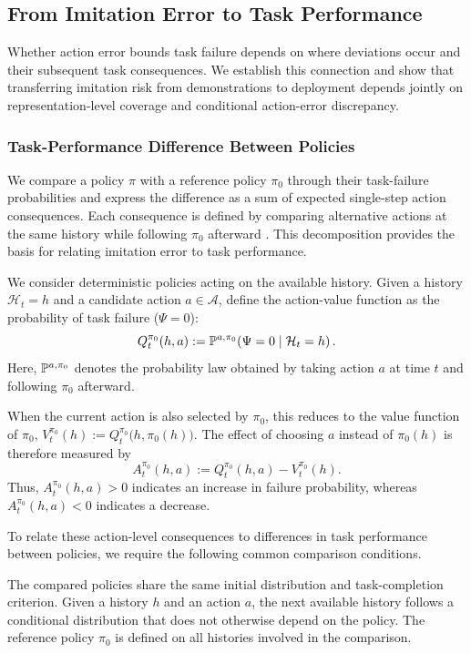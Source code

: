 \subsection{From Imitation Error to Task Performance}
\label{sec:actionanalysis}
Whether action error bounds task failure depends on where deviations occur and their subsequent task consequences.
We establish this connection and show that transferring imitation risk from demonstrations to deployment
depends jointly on representation-level coverage and conditional action-error discrepancy.

\subsubsection{Task-Performance Difference Between Policies}
\label{sec:actionconsequences}
We compare a policy $\pi$ with a reference policy $\pi_0$
through their task-failure probabilities and express the
difference as a sum of expected single-step action consequences.
Each consequence is defined by comparing alternative actions
at the same history while following $\pi_0$ afterward
\cite{ross2014aggrevate,cheng2018value}.
This decomposition provides the basis for relating imitation
error to task performance.

We consider deterministic policies acting on the available history.
Given a history $\mathcal H_t=h$ and a candidate action
$a\in\mathcal A$, define the action-value function as the
probability of task failure ($\Psi=0$):
\begin{equation}
 Q_t^{\pi_0}(h,a)
 :=\mathbb P^{a,\pi_0}\!\left(\Psi=0\mid\mathcal H_t=h\right).
 \label{eq:historyactionvalue}
\end{equation}
Here, $\mathbb P^{a,\pi_0}$ denotes the probability law obtained by
taking action $a$ at time $t$ and following $\pi_0$ afterward.

When the current action is also selected by $\pi_0$, this reduces
to the value function of $\pi_0$, $V_t^{\pi_0}(h) :=Q_t^{\pi_0}\bigl(h,\pi_0(h)\bigr).$
The effect of choosing $a$ instead of $\pi_0(h)$ is therefore
measured by
\begin{equation}
 A_t^{\pi_0}(h,a)
 :=Q_t^{\pi_0}(h,a)-V_t^{\pi_0}(h).
 \label{eq:actionconsequence}
\end{equation}
Thus, $A_t^{\pi_0}(h,a)>0$ indicates an increase in failure probability, whereas $A_t^{\pi_0}(h,a)<0$ indicates a decrease.

To relate these action-level consequences to differences in
task performance between policies, we require the following
common comparison conditions.
\begin{assumption}
\label{ass:commonprocess}
The compared policies share the same initial distribution and
task-completion criterion. Given a history $h$ and an action $a$,
the next available history follows a conditional distribution
that does not otherwise depend on the policy.
The reference policy $\pi_0$ is defined on all histories
involved in the comparison.
\end{assumption} 

